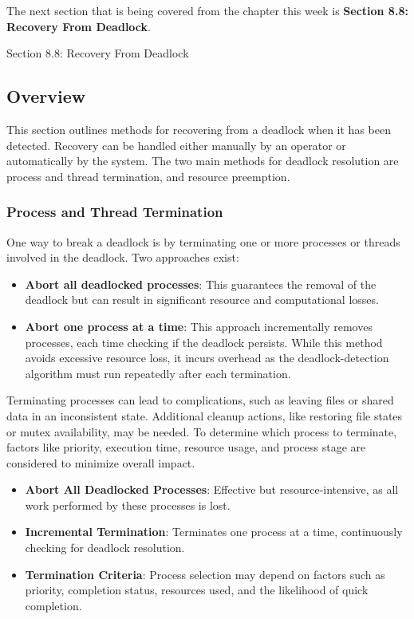 The next section that is being covered from the chapter this week is \textbf{Section 8.8: Recovery From Deadlock}.

\begin{notes}{Section 8.8: Recovery From Deadlock}
    \subsection*{Overview}

    This section outlines methods for recovering from a deadlock when it has been detected. Recovery can be handled either manually by an operator or automatically by the system. The two main methods 
    for deadlock resolution are process and thread termination, and resource preemption.
    
    \subsubsection*{Process and Thread Termination}
    
    One way to break a deadlock is by terminating one or more processes or threads involved in the deadlock. Two approaches exist:

    \begin{itemize}
        \item \textbf{Abort all deadlocked processes}: This guarantees the removal of the deadlock but can result in significant resource and computational losses.
        \item \textbf{Abort one process at a time}: This approach incrementally removes processes, each time checking if the deadlock persists. While this method avoids excessive resource loss, it 
        incurs overhead as the deadlock-detection algorithm must run repeatedly after each termination.
    \end{itemize}
    
    Terminating processes can lead to complications, such as leaving files or shared data in an inconsistent state. Additional cleanup actions, like restoring file states or mutex availability, may 
    be needed. To determine which process to terminate, factors like priority, execution time, resource usage, and process stage are considered to minimize overall impact.
    
    \begin{highlight}
    
        \begin{itemize}
            \item \textbf{Abort All Deadlocked Processes}: Effective but resource-intensive, as all work performed by these processes is lost.
            \item \textbf{Incremental Termination}: Terminates one process at a time, continuously checking for deadlock resolution.
            \item \textbf{Termination Criteria}: Process selection may depend on factors such as priority, completion status, resources used, and the likelihood of quick completion.
        \end{itemize}
    

\end{highlight}
\end{notes}
